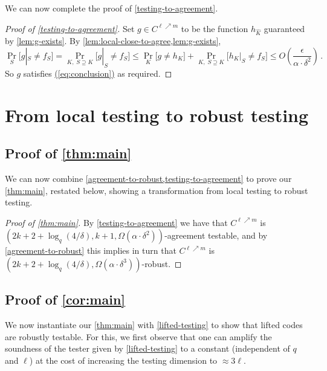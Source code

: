 \documentclass{toc}
\renewcommand{\eqref}[1]{\hyperref[#1]{(\ref*{#1})}}
\theoremstyle{plain}
\begin{document}
We can now complete the proof of \cref{testing-to-agreement}.

\begin{proof}[Proof of \cref{testing-to-agreement}]
Set $g \in C^{\ell \nearrow m}$  to be the function $h_{\hat K}$ guaranteed  by \cref{lem:g-exists}.
By \cref{lem:local-close-to-agree,lem:g-exists},
\[
\Pr_S\big[g|_S \neq f_S\big] =\Pr_{K, \; S \supseteq K}\big[g|_S \neq f_S\big]   \leq \Pr_{K}\big[g \neq h_{K}\big] + \Pr_{K, \; S \supseteq K}\big[h_{K}|_S \neq f_S\big] \leq O\left(\frac{\epsilon} {\alpha \cdot \delta^2}\right)\,.
\]
So $g$ satisfies \eqref{eq:conclusion} as required.
\end{proof}

\section{From local testing to robust testing}\label{sec:testing-to-robust}

\subsection{Proof of \cref{thm:main}}

We can now combine  \cref{agreement-to-robust,testing-to-agreement} to prove our \cref{thm:main}, restated below, showing a transformation from local testing to robust testing.

\maint*

%
%
%
%
%
%

\begin{proof}[Proof of \cref{thm:main}]
%
%

By \cref{testing-to-agreement} we have that $C^{\ell \nearrow m}$ is
$(2k+2+\log_q(4/\delta), k+1, \Omega(\alpha \cdot \delta^2))$-agreement testable, and by \cref{agreement-to-robust} this implies in turn that $C^{\ell \nearrow m}$ is $(2k+2+\log_q(4/\delta),  \Omega(\alpha \cdot \delta^3))$-robust.
\end{proof}

\subsection{Proof of \cref{cor:main}}

We now instantiate our \cref{thm:main} with \cref{lifted-testing} to show that lifted codes are robustly testable. For this, we first observe that
one can amplify the soundness of the tester given by \cref{lifted-testing}
to a constant (independent of $q$ and $\ell$) at the cost of increasing the testing dimension to $\approx 3\ell$.
\end{document}
